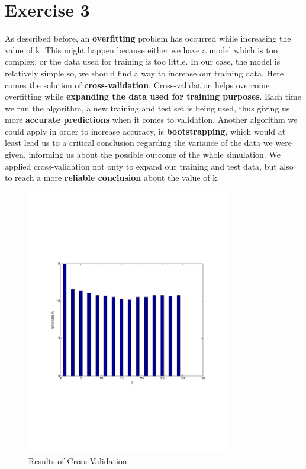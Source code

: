 \documentclass[letterpaper,11pt]{article}
\begin{document}
 \section*{Exercise 3}
As described before, an \textbf{overfitting} problem has occurred while increasing the value of k. This might happen because either we have a model which is too complex, or the data used for training is too little. In our case, the model is relatively simple so, we should find a way to increase our training data. Here comes the solution of \textbf{cross-validation}. Cross-validation helps overcome overfitting while \textbf{expanding the data used for training purposes}. Each time we run the algorithm, a new training and test set is being used, thus giving us more \textbf{accurate predictions} when it comes to validation. Another algorithm we could apply in order to increase accuracy, is \textbf{bootstrapping}, which would at least lead us to a critical conclusion regarding the variance of the data we were given, informing us about the possible outcome of the whole simulation.
We applied cross-validation not onty to expand our training and test data, but also to reach a more \textbf{reliable conclusion} about the value of k. 


\begin{figure}[!h]
\centering
  \includegraphics[trim = 0cm 7cm 0cm 7.5cm, clip, width=0.8\textwidth]{figures/CrossValResults.pdf}
  \caption{Results of Cross-Validation}
  \label{fig:4}
\end{figure}
\end{document}
